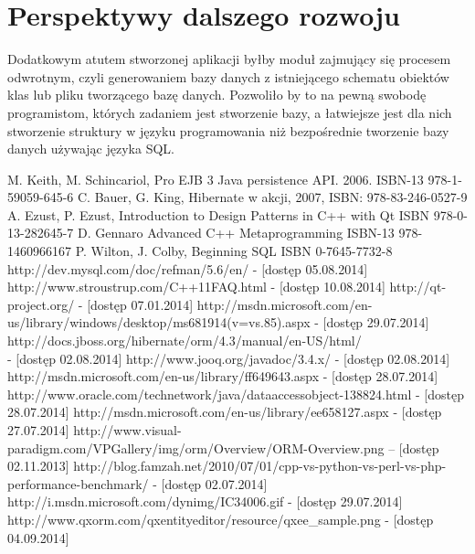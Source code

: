 \documentclass[12pt]{report}
\begin{document}
\section{Perspektywy dalszego rozwoju}
Dodatkowym atutem stworzonej aplikacji byłby moduł zajmujący się procesem odwrotnym, czyli generowaniem bazy danych z istniejącego schematu obiektów klas lub pliku tworzącego bazę danych. Pozwoliło by to na pewną swobodę programistom, których zadaniem jest stworzenie bazy, a łatwiejsze jest dla nich stworzenie struktury w języku programowania niż bezpośrednie tworzenie bazy danych używając języka SQL.
\begin{thebibliography}{99}
	 {M. Keith, M. Schincariol, Pro EJB 3 Java persistence API. 2006. ISBN-13 978-1-59059-645-6}
	 {C. Bauer, G. King, Hibernate w akcji, 2007, ISBN: 978-83-246-0527-9}
	 {A. Ezust, P. Ezust, Introduction to Design Patterns in C++ with Qt ISBN 978-0-13-282645-7}
	 {D. Gennaro Advanced C++ Metaprogramming ISBN-13 978-1460966167}
	 {P. Wilton, J. Colby, Beginning SQL ISBN 0-7645-7732-8}
	 {http://dev.mysql.com/doc/refman/5.6/en/ - [dostęp 05.08.2014]}
	 {http://www.stroustrup.com/C++11FAQ.html - [dostęp 10.08.2014]}
	 {http://qt-project.org/ - [dostęp 07.01.2014]}
	 {http://msdn.microsoft.com/en-us/library/windows/desktop/ms681914(v=vs.85).aspx - [dostęp 29.07.2014]}
	 {http://docs.jboss.org/hibernate/orm/4.3/manual/en-US/html/\\- [dostęp 02.08.2014]}
	 {http://www.jooq.org/javadoc/3.4.x/ - [dostęp 02.08.2014]}
	 {http://msdn.microsoft.com/en-us/library/ff649643.aspx - [dostęp 28.07.2014]}
	 {http://www.oracle.com/technetwork/java/dataaccessobject-138824.html - [dostęp 28.07.2014]}
	 {http://msdn.microsoft.com/en-us/library/ee658127.aspx - [dostęp 27.07.2014]}
	 http://www.visual-paradigm.com/VPGallery/img/orm/Overview/ORM-Overview.png --  [dostęp 02.11.2013]
	 http://blog.famzah.net/2010/07/01/cpp-vs-python-vs-perl-vs-php-performance-benchmark/ - [dostęp 02.07.2014]
	 {http://i.msdn.microsoft.com/dynimg/IC34006.gif - [dostęp 29.07.2014]}
	 {http://www.qxorm.com/qxentityeditor/resource/qxee\_sample.png - [dostęp 04.09.2014]}
\end{thebibliography}

\listoffigures

\listoftables
\end{document}
